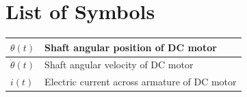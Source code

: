 


\thispagestyle{plain}
\renewcommand{\baselinestretch}{1}\small\normalsize
{}
\chapter*{List of Symbols}
\setlength{\extrarowheight}{5pt}


\begin{tabular}{P{2.5cm} L{11cm}}
$\theta (t)$ & Shaft angular position of DC motor\\
\hline
$\dot{\theta}(t)$ & Shaft angular velocity of DC motor\\
\hline
$i(t)$ & Electric current across armature of DC motor\\
\hline
\end{tabular}

\justify
